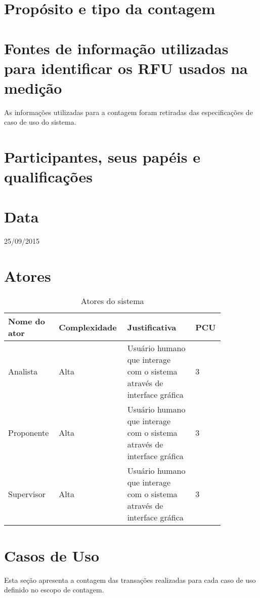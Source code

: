 \section{Propósito e tipo da contagem}

\section{Fontes de informação utilizadas para identificar os RFU usados na medição}
As informações utilizadas para a contagem foram retiradas das especificações de caso de uso do sistema.

\section{Participantes, seus papéis e qualificações}

\section{Data}
25/09/2015

\section{Atores}

\begin{table*}[!h]
\centering
\caption{Atores do sistema}
\label{Rotulo}
  \begin{tabular}{|p{0.20\linewidth}|p{0.25\linewidth}|p{0.30\linewidth}|p{0.10\linewidth}|}
  \hline
  \textbf{Nome do ator} & \textbf{Complexidade} & \textbf{Justificativa} & \textbf{PCU} \\ 
  \hline

  Analista & Alta & Usuário humano que interage com o sistema através de interface gráfica & 3 \\
  \hline
  Proponente & Alta & Usuário humano que interage com o sistema através de interface gráfica & 3\\
  \hline
  Supervisor & Alta & Usuário humano que interage com o sistema através de interface gráfica & 3\\
  \hline
  \end{tabular}
\end{table*}


\section{Casos de Uso}

  Esta seção apresenta a contagem das transações realizadas para cada caso de uso definido no escopo de contagem.

